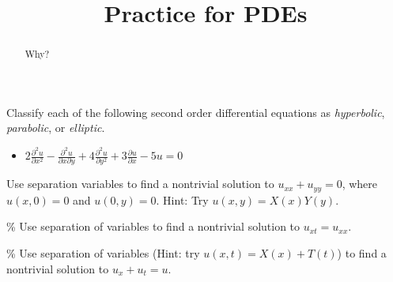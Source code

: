 \documentclass{ximera}
\title{Practice for PDEs}
\begin{document}
\begin{abstract}
Why?
\end{abstract}
\maketitle

\begin{exercise}
    Classify each of the following second order differential equations as \emph{hyperbolic}, \emph{parabolic}, or \emph{elliptic}.
    \begin{itemize}
        \item $\displaystyle 2 \frac{\partial^2 u}{\partial x^2} - \frac{\partial^2 u}{\partial x \partial y} + 4 \frac{\partial^2 u}{\partial y^2} + 3 \frac{\partial u}{\partial x} - 5u = 0$
    \end{itemize}
\end{exercise}

\begin{exercise}
    Use separation variables to find a nontrivial solution to $u_{xx} + u_{yy} = 0$, where $u(x,0) = 0$ and $u(0,y) = 0$. Hint: Try $u(x,y) = X(x)Y(y)$.
\end{exercise}

\begin{exercise}\%
    Use separation of variables to find a nontrivial solution to $u_{xt} = u_{xx}$.
\end{exercise}

\begin{exercise}\%
    Use separation of variables (Hint: try $u(x,t) = X(x)+T(t)$) to find a nontrivial solution to $u_{x} + u_{t} = u$.
\end{exercise}
%
\end{document}
